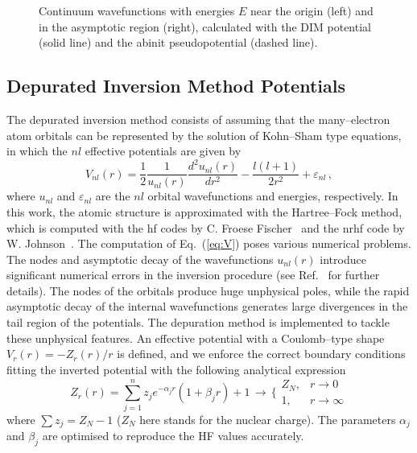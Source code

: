 \documentclass[10pt]{article}
\begin{document}
\begin{figure}[H]
 \caption{Continuum wavefunctions with energies $E$ near the origin 
 (left) and in the asymptotic region (right), calculated with the 
 DIM potential (solid line) and the {\sc abinit} pseudopotential 
 (dashed line).}
 \label{fig:contLi}
\end{figure}

\subsection{Depurated Inversion Method Potentials}
\label{sec:DIM}

The depurated inversion method \cite{Mendez2015,Mendez2016,Mendez2018} 
consists of assuming that the many--electron atom orbitals can be 
represented by the solution of Kohn--Sham type equations, in which 
the $nl$ effective potentials are given by 
\begin{equation}
V_{nl}(r) = 
\frac{1}{2}\frac{1}{u_{nl}(r)}
\frac{d^2u_{nl}(r)}{dr^{2}} - 
\frac{l(l+1)}{2r^{2}}+\varepsilon_{nl} \, ,
\label{eq:V}
\end{equation}
where $u_{nl}$ and $\varepsilon_{nl}$ are the $nl$ orbital 
wavefunctions and energies, respectively. In this work, the atomic 
structure is approximated with the Hartree--Fock method, which is 
computed with the {\sc hf} codes by C. Froese 
Fischer~\cite{FroeseFischer1997} and the {\sc nrhf} code by 
W. Johnson~\cite{Johnson2007}. The computation of Eq.~(\ref{eq:V}) 
poses various numerical problems. The nodes and asymptotic decay of 
the wavefunctions $u_{nl}(r)$ introduce significant numerical errors 
in the inversion procedure (see Ref.~\cite{Mendez2018} for further 
details). The nodes of the orbitals produce huge unphysical poles, 
while the rapid asymptotic decay of the internal wavefunctions 
generates large divergences in the tail region of the potentials. 
The depuration method is implemented to tackle these unphysical 
features. An effective potential with a Coulomb--type shape 
$V_r(r)=-Z_r(r)/r$ is defined, and we enforce the correct boundary 
conditions fitting the inverted potential with the following 
analytical expression
\begin{equation}
 Z_r(r) = \sum_{j=1}^n z_j e^{-\alpha_j r}(1+\beta_jr) + 1
 \, \longrightarrow \, \bigg\{
 \begin{array}{cc}
  Z_N, & r\rightarrow0 \\
  1, & r\rightarrow\infty 
 \end{array}
 \label{eq:atomiczDIM}
\end{equation} 
where \mbox{$\sum z_j = Z_N-1$} ($Z_N$ here stands for the nuclear 
charge). The parameters $\alpha_j$ and $\beta_j$ are optimised to 
reproduce the HF values accurately. 
\end{document}
